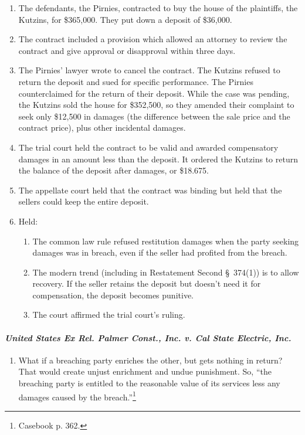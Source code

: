 \begin{enumerate}
    \item The defendants, the Pirnies, contracted to buy the house of the 
    plaintiffs, the Kutzins, for \$365,000. They put down a deposit of 
    \$36,000.
    \item The contract included a provision which allowed an attorney to 
    review the contract and give approval or disapproval within three days.
    \item The Pirnies' lawyer wrote to cancel the contract. The Kutzins 
    refused to return the deposit and sued for specific performance. The 
    Pirnies counterclaimed for the return of their deposit. While the case 
    was pending, the Kutzins sold the house for \$352,500, so they amended 
    their complaint to seek only \$12,500 in damages (the difference between 
    the sale price and the contract price), plus other incidental damages.
    \item The trial court held the contract to be valid and awarded
    compensatory damages in an amount less than the deposit. It ordered the 
    Kutzins to return the balance of the deposit after damages, or \$18.675.
    \item The appellate court held that the contract was binding but held that 
    the sellers could keep the entire deposit.
    \item Held:
    \begin{enumerate}
        \item The common law rule refused restitution damages when the party 
        seeking damages was in breach, even if the seller had profited from 
        the breach.
        \item The modern trend (including in Restatement Second \S\ 374(1)) is 
        to allow recovery. If the seller retains the deposit but doesn't need 
        it for compensation, the deposit becomes punitive.
        \item The court affirmed the trial court's ruling.
    \end{enumerate}
\end{enumerate}

\paragraph{\emph{United States Ex Rel. Palmer Const., Inc. v. Cal State 
Electric, Inc.}}

\begin{enumerate}
    \item What if a breaching party enriches the other, but gets nothing in 
    return? That would create unjust enrichment and undue punishment. So, 
    ``the breaching party is entitled to the reasonable value of its services 
    less any damages caused by the breach.''\footnote{Casebook p. 362.}
\end{enumerate}

